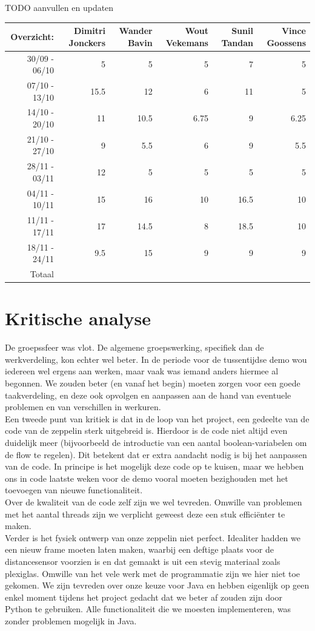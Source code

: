 \documentclass[eind]{penoverslag}
\begin{document}
TODO aanvullen en updaten

\begin{tabular}{r||r|r|r|r|r}
Overzicht: & Dimitri Jonckers & Wander Bavin & Wout Vekemans & Sunil Tandan & Vince Goossens \\
\hline \hline 
30/09 - 06/10 & 5 & 5 & 5 & 7 & 5 \\
07/10 - 13/10 & 15.5 & 12 & 6 & 11 & 5 \\
14/10 - 20/10 & 11 & 10.5 & 6.75 & 9 & 6.25 \\
21/10 - 27/10 & 9 & 5.5 & 6 & 9 & 5.5 \\
28/11 - 03/11 & 12 & 5 & 5 & 5 & 5 \\
04/11 - 10/11 & 15 & 16 & 10 & 16.5 & 10 \\
11/11 - 17/11 & 17 & 14.5 & 8 & 18.5 & 10 \\
18/11 - 24/11 & 9.5 & 15 & 9 & 9 & 9 \\
\hline \hline
Totaal &  &  &  &  &  \\
\end{tabular}

\section{Kritische analyse}
De groepssfeer was vlot. De algemene groepswerking, specifiek dan de werkverdeling, kon echter wel beter. In de periode voor de tussentijdse demo wou iedereen wel ergens aan werken, maar vaak was iemand anders hiermee al begonnen. We zouden beter (en vanaf het begin) moeten zorgen voor een goede taakverdeling, en deze ook opvolgen en aanpassen aan de hand van eventuele problemen en van verschillen in werkuren. \\
Een tweede punt van kritiek is dat in de loop van het project, een gedeelte van de code van de zeppelin sterk uitgebreid is. Hierdoor is de code niet altijd even duidelijk meer (bijvoorbeeld de introductie van een aantal boolean-variabelen om de flow te regelen). Dit betekent dat er extra aandacht nodig is bij het aanpassen van de code. In principe is het mogelijk deze code op te kuisen, maar we hebben ons in code laatste weken voor de demo vooral moeten bezighouden met het toevoegen van nieuwe functionaliteit. \\
Over de kwaliteit van de code zelf zijn we wel tevreden. Omwille van problemen met het aantal threads zijn we verplicht geweest deze een stuk efficiënter te maken. \\
Verder is het fysiek ontwerp van onze zeppelin niet perfect. Idealiter hadden we een nieuw frame moeten laten maken, waarbij een deftige plaats voor de distancesensor voorzien is en dat gemaakt is uit een stevig materiaal zoals plexiglas. Omwille van het vele werk met de programmatie zijn we hier niet toe gekomen.
We zijn tevreden over onze keuze voor Java en hebben eigenlijk op geen enkel moment tijdens het project gedacht dat we beter af zouden zijn door Python te gebruiken. Alle functionaliteit die we moesten implementeren, was zonder problemen mogelijk in Java. \\
\end{document}
